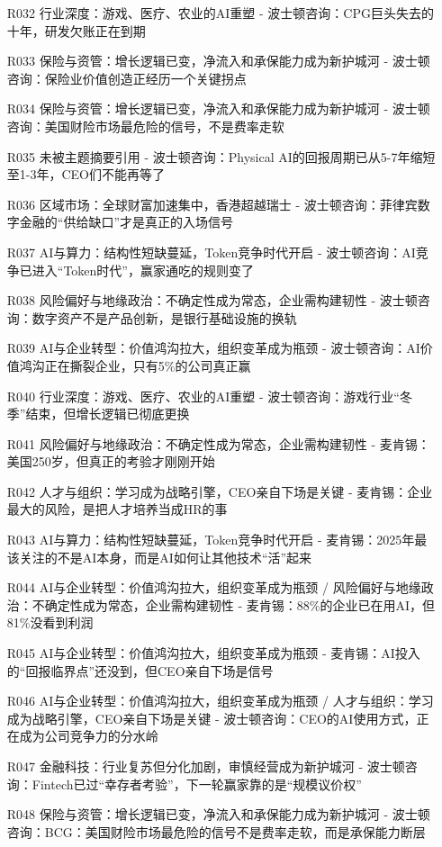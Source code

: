 \documentclass[11pt]{ctexart}
\begin{document}
\begin{itemize}
  \item [R032] 行业深度：游戏、医疗、农业的AI重塑 - 波士顿咨询：CPG巨头失去的十年，研发欠账正在到期
  \item [R033] 保险与资管：增长逻辑已变，净流入和承保能力成为新护城河 - 波士顿咨询：保险业价值创造正经历一个关键拐点
  \item [R034] 保险与资管：增长逻辑已变，净流入和承保能力成为新护城河 - 波士顿咨询：美国财险市场最危险的信号，不是费率走软
  \item [R035] 未被主题摘要引用 - 波士顿咨询：Physical AI的回报周期已从5-7年缩短至1-3年，CEO们不能再等了
  \item [R036] 区域市场：全球财富加速集中，香港超越瑞士 - 波士顿咨询：菲律宾数字金融的“供给缺口”才是真正的入场信号
  \item [R037] AI与算力：结构性短缺蔓延，Token竞争时代开启 - 波士顿咨询：AI竞争已进入“Token时代”，赢家通吃的规则变了
  \item [R038] 风险偏好与地缘政治：不确定性成为常态，企业需构建韧性 - 波士顿咨询：数字资产不是产品创新，是银行基础设施的换轨
  \item [R039] AI与企业转型：价值鸿沟拉大，组织变革成为瓶颈 - 波士顿咨询：AI价值鸿沟正在撕裂企业，只有5\%的公司真正赢
  \item [R040] 行业深度：游戏、医疗、农业的AI重塑 - 波士顿咨询：游戏行业“冬季”结束，但增长逻辑已彻底更换
  \item [R041] 风险偏好与地缘政治：不确定性成为常态，企业需构建韧性 - 麦肯锡：美国250岁，但真正的考验才刚刚开始
  \item [R042] 人才与组织：学习成为战略引擎，CEO亲自下场是关键 - 麦肯锡：企业最大的风险，是把人才培养当成HR的事
  \item [R043] AI与算力：结构性短缺蔓延，Token竞争时代开启 - 麦肯锡：2025年最该关注的不是AI本身，而是AI如何让其他技术“活”起来
  \item [R044] AI与企业转型：价值鸿沟拉大，组织变革成为瓶颈 / 风险偏好与地缘政治：不确定性成为常态，企业需构建韧性 - 麦肯锡：88\%的企业已在用AI，但81\%没看到利润
  \item [R045] AI与企业转型：价值鸿沟拉大，组织变革成为瓶颈 - 麦肯锡：AI投入的“回报临界点”还没到，但CEO亲自下场是信号
  \item [R046] AI与企业转型：价值鸿沟拉大，组织变革成为瓶颈 / 人才与组织：学习成为战略引擎，CEO亲自下场是关键 - 波士顿咨询：CEO的AI使用方式，正在成为公司竞争力的分水岭
  \item [R047] 金融科技：行业复苏但分化加剧，审慎经营成为新护城河 - 波士顿咨询：Fintech已过“幸存者考验”，下一轮赢家靠的是“规模议价权”
  \item [R048] 保险与资管：增长逻辑已变，净流入和承保能力成为新护城河 - 波士顿咨询：BCG：美国财险市场最危险的信号不是费率走软，而是承保能力断层

\end{itemize}
\end{document}
